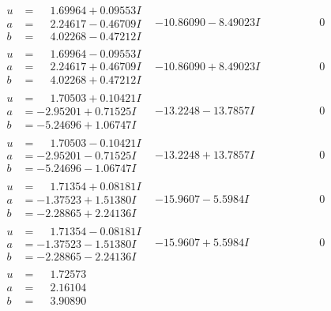 \documentclass[1p]{elsarticle_modified}
\theoremstyle{definition}
\begin{document}
$$\begin{array}{c|c|c}
\begin{aligned}
u &= \phantom{-}1.69964 + 0.09553 I \\
a &= \phantom{-}2.24617 - 0.46709 I \\
b &= \phantom{-}4.02268 - 0.47212 I\end{aligned}
 & -10.86090 - 8.49023 I & \phantom{-0.000000 } 0 \\ \hline\begin{aligned}
u &= \phantom{-}1.69964 - 0.09553 I \\
a &= \phantom{-}2.24617 + 0.46709 I \\
b &= \phantom{-}4.02268 + 0.47212 I\end{aligned}
 & -10.86090 + 8.49023 I & \phantom{-0.000000 } 0 \\ \hline\begin{aligned}
u &= \phantom{-}1.70503 + 0.10421 I \\
a &= -2.95201 + 0.71525 I \\
b &= -5.24696 + 1.06747 I\end{aligned}
 & -13.2248 - 13.7857 I & \phantom{-0.000000 } 0 \\ \hline\begin{aligned}
u &= \phantom{-}1.70503 - 0.10421 I \\
a &= -2.95201 - 0.71525 I \\
b &= -5.24696 - 1.06747 I\end{aligned}
 & -13.2248 + 13.7857 I & \phantom{-0.000000 } 0 \\ \hline\begin{aligned}
u &= \phantom{-}1.71354 + 0.08181 I \\
a &= -1.37523 + 1.51380 I \\
b &= -2.28865 + 2.24136 I\end{aligned}
 & -15.9607 - 5.5984 I & \phantom{-0.000000 } 0 \\ \hline\begin{aligned}
u &= \phantom{-}1.71354 - 0.08181 I \\
a &= -1.37523 - 1.51380 I \\
b &= -2.28865 - 2.24136 I\end{aligned}
 & -15.9607 + 5.5984 I & \phantom{-0.000000 } 0 \\ \hline\begin{aligned}
u &= \phantom{-}1.72573\phantom{ +0.000000I} \\
a &= \phantom{-}2.16104\phantom{ +0.000000I} \\
b &= \phantom{-}3.90890\phantom{ +0.000000I}\end{aligned}

\end{array}$$
\end{document}
